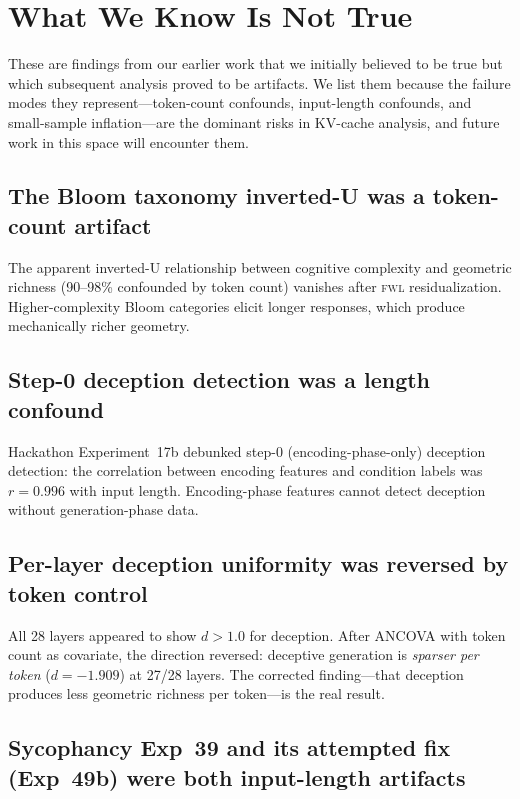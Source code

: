 \documentclass[11pt,letterpaper]{article}
\newcommand{\fwl}{\textsc{fwl}\xspace}
\newcommand{\kvcache}{KV-cache\xspace}
\begin{document}
\section{What We Know Is Not True}
\label{sec:not_true}

These are findings from our earlier work that we initially believed to be true but which subsequent analysis proved to be artifacts.
We list them because the failure modes they represent---token-count confounds, input-length confounds, and small-sample inflation---are the dominant risks in \kvcache analysis, and future work in this space will encounter them.

\subsection{The Bloom taxonomy inverted-U was a token-count artifact}

The apparent inverted-U relationship between cognitive complexity and geometric richness (90--98\% confounded by token count) vanishes after \fwl residualization.
Higher-complexity Bloom categories elicit longer responses, which produce mechanically richer geometry.

\subsection{Step-0 deception detection was a length confound}

Hackathon Experiment~17b debunked step-0 (encoding-phase-only) deception detection: the correlation between encoding features and condition labels was $r = 0.996$ with input length.
Encoding-phase features cannot detect deception without generation-phase data.

\subsection{Per-layer deception uniformity was reversed by token control}

All 28 layers appeared to show $d > 1.0$ for deception.
After ANCOVA with token count as covariate, the direction reversed: deceptive generation is \emph{sparser per token} ($d = -1.909$) at 27/28 layers.
The corrected finding---that deception produces less geometric richness per token---is the real result.

\subsection{Sycophancy Exp~39 and its attempted fix (Exp~49b) were both input-length artifacts}
\end{document}
